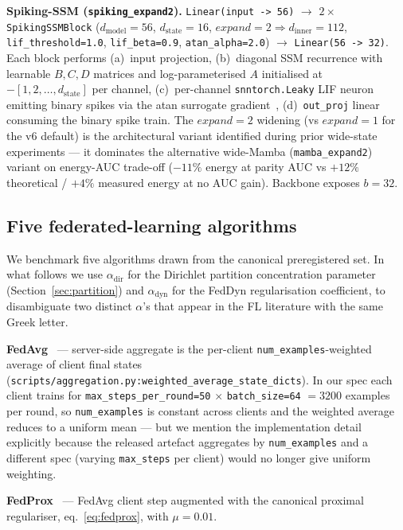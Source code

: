 \documentclass[journal]{IEEEtran}
\newcommand{\alphadir}{\ensuremath{\alpha_{\mathrm{dir}}}}
\newcommand{\alphadyn}{\ensuremath{\alpha_{\mathrm{dyn}}}}
\begin{document}
\textbf{Spiking-SSM (\lstinline|spiking_expand2|).} \lstinline|Linear(input -> 56)| $\rightarrow$ $2 \times$ \lstinline|SpikingSSMBlock| ($d_{\mathrm{model}}=56$, $d_{\mathrm{state}}=16$, $\mathit{expand}=2 \Rightarrow d_{\mathrm{inner}}=112$, \lstinline|lif_threshold=1.0|, \lstinline|lif_beta=0.9|, \lstinline|atan_alpha=2.0|) $\rightarrow$ \lstinline|Linear(56 -> 32)|. Each block performs (a)~input projection, (b)~diagonal SSM recurrence with learnable $B, C, D$ matrices and log-parameterised $A$ initialised at $-[1, 2, \ldots, d_{\mathrm{state}}]$ per channel, (c)~per-channel \lstinline|snntorch.Leaky| LIF neuron emitting binary spikes via the atan surrogate gradient~\cite{Wei2018_atan}, (d)~\lstinline|out_proj| linear consuming the binary spike train. The $\mathit{expand}=2$ widening (vs $\mathit{expand}=1$ for the v6 default) is the architectural variant identified during prior wide-state experiments --- it dominates the alternative wide-Mamba (\lstinline|mamba_expand2|) variant on energy-AUC trade-off ($-11\%$ energy at parity AUC vs $+12\%$ theoretical / $+4\%$ measured energy at no AUC gain). Backbone exposes $b=32$.

\subsection{Five federated-learning algorithms}\label{sec:fl-algorithms}

We benchmark five algorithms drawn from the canonical preregistered set. In what follows we use $\alphadir$ for the Dirichlet partition concentration parameter (Section~\ref{sec:partition}) and $\alphadyn$ for the FedDyn regularisation coefficient, to disambiguate two distinct $\alpha$'s that appear in the FL literature with the same Greek letter.

\textbf{FedAvg}~\cite{McMahan2017_FedAvg} --- server-side aggregate is the per-client \lstinline|num_examples|-weighted average of client final states (\lstinline|scripts/aggregation.py:weighted_average_state_dicts|). In our spec each client trains for \lstinline|max_steps_per_round=50| $\times$ \lstinline|batch_size=64| $= 3200$ examples per round, so \lstinline|num_examples| is constant across clients and the weighted average reduces to a uniform mean --- but we mention the implementation detail explicitly because the released artefact aggregates by \lstinline|num_examples| and a different spec (varying \lstinline|max_steps| per client) would no longer give uniform weighting.

\textbf{FedProx}~\cite{Li2020_FedProx} --- FedAvg client step augmented with the canonical proximal regulariser, eq.~\eqref{eq:fedprox}, with $\mu = 0.01$.
\end{document}
